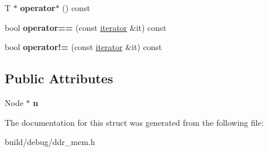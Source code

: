 \begin{DoxyCompactItemize}
\item 
\hypertarget{structRequestQueue_1_1iterator_a4a30ee1943a2ed409656b28943b5b9d6}{T $\ast$ {\bfseries operator$\ast$} () const }\label{structRequestQueue_1_1iterator_a4a30ee1943a2ed409656b28943b5b9d6}

\item 
\hypertarget{structRequestQueue_1_1iterator_a9732619b2d13264887cfc4762f4a2ab2}{bool {\bfseries operator==} (const \hyperlink{structRequestQueue_1_1iterator}{iterator} \&it) const }\label{structRequestQueue_1_1iterator_a9732619b2d13264887cfc4762f4a2ab2}

\item 
\hypertarget{structRequestQueue_1_1iterator_af4f57acd1a7ebdc7f3a896adc726b27e}{bool {\bfseries operator!=} (const \hyperlink{structRequestQueue_1_1iterator}{iterator} \&it) const }\label{structRequestQueue_1_1iterator_af4f57acd1a7ebdc7f3a896adc726b27e}

\end{DoxyCompactItemize}
\subsection*{Public Attributes}
\begin{DoxyCompactItemize}
\item 
\hypertarget{structRequestQueue_1_1iterator_a2bd6bf4aa270b56bfc53166b0bd170a5}{Node $\ast$ {\bfseries n}}\label{structRequestQueue_1_1iterator_a2bd6bf4aa270b56bfc53166b0bd170a5}

\end{DoxyCompactItemize}


The documentation for this struct was generated from the following file\-:\begin{DoxyCompactItemize}
\item 
build/debug/ddr\-\_\-mem.\-h\end{DoxyCompactItemize}
